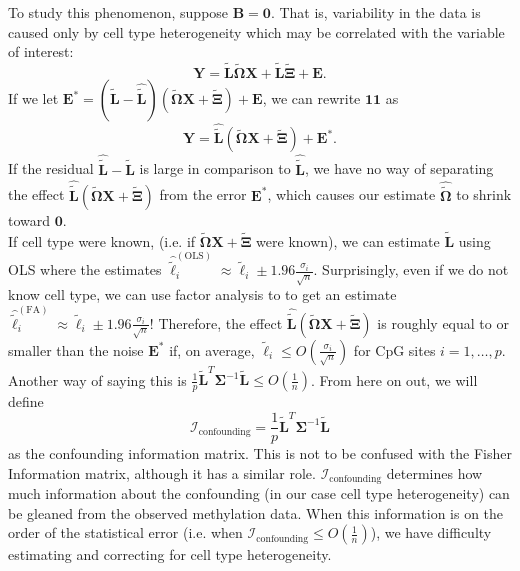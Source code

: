 \documentclass{article}
\begin{document}
\indent To study this phenomenon, suppose $\bm{B} = \bm{0}$. That is, variability in the data is caused only by cell type heterogeneity which may be correlated with the variable of interest:
\begin{equation}
\bm{Y} = \tilde{\bm{L}}\tilde{\bm{\Omega}}\bm{X} + \tilde{\bm{L}}\tilde{\bm{\Xi}} + \bm{E}.
\end{equation}
If we let $\bm{E}^* = \left( \tilde{\bm{L}} - \hat{\tilde{\bm{L}}} \right) \left(\tilde{\bm{\Omega}}\bm{X} + \tilde{\bm{\Xi}} \right) +  \bm{E}$, we can rewrite $\bm{11}$ as
\begin{equation}
\bm{Y} = \hat{\tilde{\bm{L}}}\left(\tilde{\bm{\Omega}}\bm{X} + \tilde{\bm{\Xi}} \right) + \bm{E}^*.
\end{equation} 
If the residual $\hat{\bm{\tilde{L}}} - \bm{\tilde{L}}$ is large in comparison to $\hat{\tilde{\bm{L}}}$, we have no way of separating the effect $\hat{\tilde{\bm{L}}}\left(\tilde{\bm{\Omega}}\bm{X} + \tilde{\bm{\Xi}} \right)$ from the error $\bm{E}^*$, which causes our estimate $\hat{\tilde{\bm{\Omega}}}$ to shrink toward $\bm{0}$.\\
\indent If cell type were known, (i.e. if $\tilde{\bm{\Omega}}\bm{X} + \tilde{\bm{\Xi}}$ were known), we can estimate $\tilde{\bm{L}}$ using OLS where the estimates $\hat{\tilde{\bm{\ell}}}_i^{(\text{OLS})} \approx \tilde{\bm{\ell}}_i \pm 1.96\frac{\sigma_i}{\sqrt{n}}$. Surprisingly, even if we do not know cell type, we can use factor analysis to to get an estimate $\hat{\tilde{\bm{\ell}}}_i^{(\text{FA})} \approx \tilde{\bm{\ell}}_i \pm 1.96\frac{\sigma_i}{\sqrt{n}}$! Therefore, the effect $\hat{\tilde{\bm{L}}}\left(\tilde{\bm{\Omega}}\bm{X} + \tilde{\bm{\Xi}} \right)$ is roughly equal to or smaller than the noise $\bm{E}^*$ if, on average, $\tilde{\bm{\ell}}_i \leq O\left( \frac{\sigma_i}{\sqrt{n}} \right)$ for CpG sites $i = 1, \ldots, p$. Another way of saying this is $\frac{1}{p}\tilde{\bm{L}}^T \bm{\Sigma}^{-1}\tilde{\bm{L}} \leq O\left( \frac{1}{n} \right)$. From here on out, we will define
\begin{equation}
\mathcal{I}_{\text{confounding}} = \frac{1}{p}\tilde{\bm{L}}^T \bm{\Sigma}^{-1}\tilde{\bm{L}}
\end{equation}
as the confounding information matrix. This is not to be confused with the Fisher Information matrix, although it has a similar role. $\mathcal{I}_{\text{confounding}}$ determines how much information about the confounding (in our case cell type heterogeneity) can be gleaned from the observed methylation data. When this information is on the order of the statistical error (i.e. when $\mathcal{I}_{\text{confounding}} \leq O\left( \frac{1}{n} \right)$), we have difficulty estimating and correcting for cell type heterogeneity.\\
\end{document}

